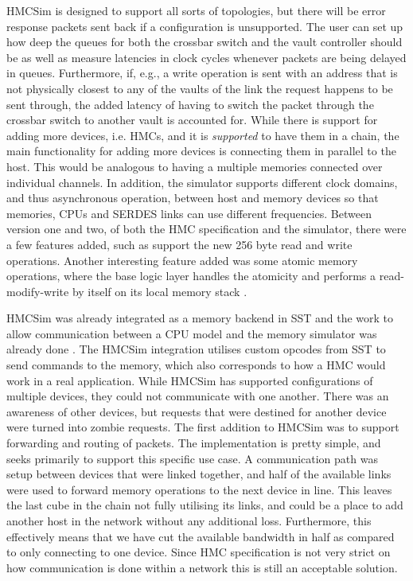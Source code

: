 HMCSim is designed to support all sorts of topologies, but there will be error response packets sent back if a configuration is unsupported. The user can set up how deep the queues for both the crossbar switch and the vault controller should be as well as measure latencies in clock cycles whenever packets are being delayed in queues. Furthermore, if, e.g., a write operation is sent with an address that is not physically closest to any of the vaults of the link the request happens to be sent through, the added latency of having to switch the packet through the crossbar switch to another vault is accounted for. While there is support for adding more devices, i.e. HMCs, and it is \emph{supported} to have them in a chain, the main functionality for adding more devices is connecting them in parallel to the host. This would be analogous to having a multiple memories connected over individual channels. In addition, the simulator supports different clock domains, and thus asynchronous operation, between host and memory devices so that memories, CPUs and SERDES links can use different frequencies. Between version one and two, of both the HMC specification and the simulator, there were a few features added, such as support the new 256 byte read and write operations. Another interesting feature added was some atomic memory operations, where the base logic layer handles the atomicity and performs a read-modify-write by itself on its local memory stack \cite{7529923}.
\bigskip

HMCSim was already integrated as a memory backend in SST and the work to allow communication between a CPU model and the memory simulator was already done \cite{voskuilen2018sst}. The HMCSim integration utilises custom opcodes from SST to send commands to the memory, which also corresponds to how a HMC would work in a real application. While HMCSim has supported configurations of multiple devices, they could not communicate with one another. There was an awareness of other devices, but requests that were destined for another device were turned into zombie requests. The first addition to HMCSim was to support forwarding and routing of packets. The implementation is pretty simple, and seeks primarily to support this specific use case. A communication path was setup between devices that were linked together, and half of the available links were used to forward memory operations to the next device in line. This leaves the last cube in the chain not fully utilising its links, and could be a place to add another host in the network without any additional loss. Furthermore, this effectively means that we have cut the available bandwidth in half as compared to only connecting to one device. Since HMC specification is not very strict on how communication is done within a network this is still an acceptable solution.
\bigskip


